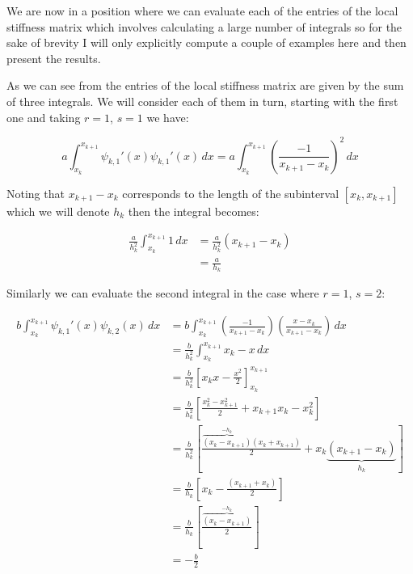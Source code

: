 We are now in a position where we can evaluate each of the entries of the local
stiffness matrix which involves calculating a large number of integrals so for
the sake of brevity I will only explicitly compute a couple of examples here
and then present the results.

As we can see from  the entries of
the local stiffness matrix are given by the sum of three integrals. We will
consider each of them in turn, starting with the first one and taking $r = 1$,
$s = 1$ we have:

\begin{equation*}
       a\int_{x_k}^{x_{k+1}}\psi_{k,1}'(x)\psi_{k,1}'(x)\, dx =
         a\int_{x_k}^{x_{k+1}}\left(\frac{-1}{x_{k+1} - x_k}\right)^2\, dx
\end{equation*}

Noting that $x_{k+1} - x_k$ corresponds to the length of the subinterval
$[x_k, x_{k+1}]$ which we will denote $h_k$ then the integral becomes:

\begin{align*}
    \frac{a}{h_k^2}\int_{x_k}^{x_{k+1}}1\, dx &= \frac{a}{h_k^2}(x_{k+1} - x_k) \\
          &= \frac{a}{h_k}
\end{align*}

Similarly we can evaluate the second integral in the case where $r=1$, $s=2$:

\begin{align*}
    b\int_{x_k}^{x_{k+1}}\psi_{k,1}'(x)\psi_{k,2}(x)\, dx
      &=  b\int_{x_k}^{x_{k+1}}\left(\frac{-1}{x_{k+1} - x_k}\right)
                               \left(\frac{x - x_k}{x_{k+1} - x_k}\right)\, dx \\
      &= \frac{b}{h_k^2}\int_{x_k}^{x_{k+1}}x_k - x\, dx \\
      &= \frac{b}{h_k^2}\left[x_kx - \frac{x^2}{2}\right]_{x_k}^{x_{k+1}} \\
      &= \frac{b}{h_k^2}\left[ \frac{x_k^2 - x_{k+1}^2}{2} + x_{k+1}x_k - x_k^2 \right] \\
      &= \frac{b}{h_k^2}\left[ \frac{\overbrace{(x_k - x_{k+1})}^{-h_k}(x_k + x_{k+1})}{2}
              + x_k\underbrace{(x_{k+1} - x_k)}_{h_k}\right] \\
      &= \frac{b}{h_k}\left[ x_k - \frac{(x_{k+1} + x_k)}{2} \right] \\
      &= \frac{b}{h_k}\left[\frac{\overbrace{(x_k - x_{k+1})}^{-h_k}}{2}\right] \\
      &= -\frac{b}{2}
\end{align*}

